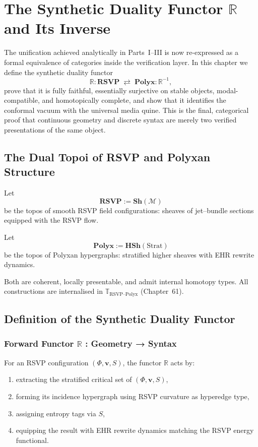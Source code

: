 \chapter{The Synthetic Duality Functor \texorpdfstring{$\mathbb{R}$}{R} and Its Inverse}
\label{ch:synthetic-duality}

The unification achieved analytically in Parts~I--III is now re-expressed as a
formal equivalence of categories inside the verification layer.
In this chapter we define the synthetic duality functor
\[
\mathbb{R} : \mathbf{RSVP} \;\rightleftarrows\; \mathbf{Polyx} : \mathbb{R}^{-1},
\]
prove that it is fully faithful, essentially surjective on stable objects,
modal-compatible, and homotopically complete,
and show that it identifies the conformal vacuum with the universal media quine.
This is the final, categorical proof that continuous geometry and discrete syntax
are merely two verified presentations of the same object.

\section{The Dual Topoi of RSVP and Polyxan Structure}

Let
\[
\mathbf{RSVP} := \mathbf{Sh}(\mathcal{M})
\]
be the topos of smooth RSVP field configurations:
sheaves of jet--bundle sections equipped with the RSVP flow.

Let
\[
\mathbf{Polyx} := \mathbf{HSh}(\mathrm{Strat})
\]
be the topos of Polyxan hypergraphs:
stratified higher sheaves with EHR rewrite dynamics.

Both are coherent, locally presentable, and admit internal homotopy types.
All constructions are internalised in
$\mathbb{T}_{\mathrm{RSVP\text{--}Polyx}}$ (Chapter~61).

\section{Definition of the Synthetic Duality Functor}

\subsection{Forward Functor \texorpdfstring{$\mathbb{R}$}{R} : Geometry → Syntax}

For an RSVP configuration $(\Phi,\mathbf{v},S)$,
the functor $\mathbb{R}$ acts by:

\begin{enumerate}
\item extracting the stratified critical set of $(\Phi,\mathbf{v},S)$,
\item forming its incidence hypergraph using RSVP curvature as hyperedge type,
\item assigning entropy tags via $S$,
\item equipping the result with EHR rewrite dynamics matching the RSVP energy functional.
\end{enumerate}


